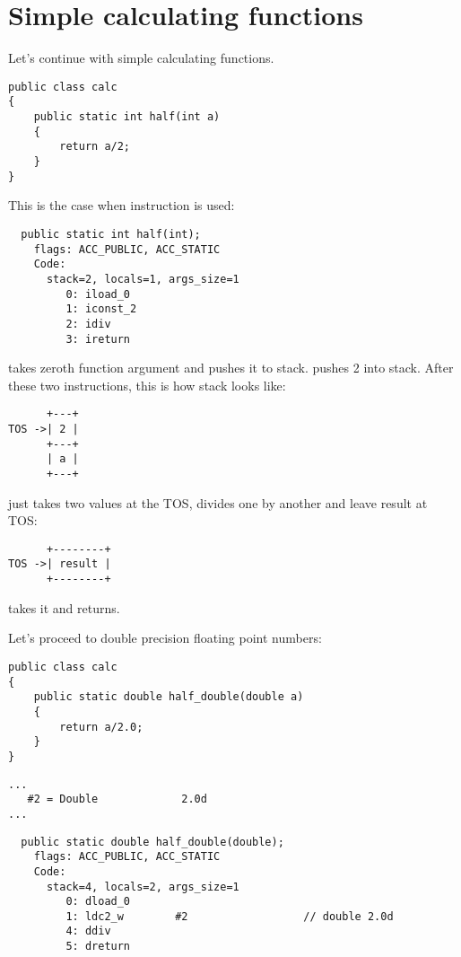\section{Simple calculating functions}

Let's continue with simple calculating functions.

\begin{lstlisting}
public class calc
{
	public static int half(int a)
	{
		return a/2;
	}
}
\end{lstlisting}

This is the case when  instruction is used:

\begin{lstlisting}
  public static int half(int);
    flags: ACC_PUBLIC, ACC_STATIC
    Code:
      stack=2, locals=1, args_size=1
         0: iload_0       
         1: iconst_2      
         2: idiv          
         3: ireturn       
\end{lstlisting}
         
 takes zeroth function argument and pushes it to stack.
 pushes 2 into stack.
After these two instructions, this is how stack looks like:

\begin{lstlisting}
      +---+
TOS ->| 2 |
      +---+
      | a |
      +---+
\end{lstlisting}

 just takes two values at the \ac{TOS}, divides one by another and leave
result at \ac{TOS}:

\begin{lstlisting}
      +--------+
TOS ->| result |
      +--------+
\end{lstlisting}

 takes it and returns.

Let's proceed to double precision floating point numbers:

\begin{lstlisting}
public class calc
{
	public static double half_double(double a)
	{
		return a/2.0;
	}
}
\end{lstlisting}

\begin{lstlisting}[caption=Constant pool]
...
   #2 = Double             2.0d
...
\end{lstlisting}

\begin{lstlisting}
  public static double half_double(double);
    flags: ACC_PUBLIC, ACC_STATIC
    Code:
      stack=4, locals=2, args_size=1
         0: dload_0       
         1: ldc2_w        #2                  // double 2.0d
         4: ddiv          
         5: dreturn       
\end{lstlisting}


